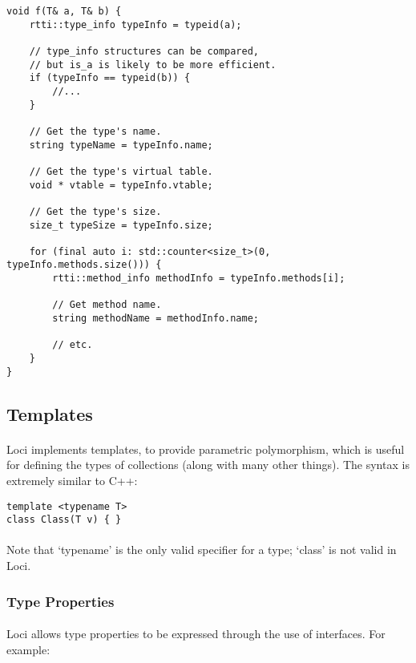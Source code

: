 \documentclass[12pt,twoside,notitlepage]{report}
\begin{document}
\begin{lstlisting}
void f(T& a, T& b) {
	rtti::type_info typeInfo = typeid(a);
	
	// type_info structures can be compared,
	// but is_a is likely to be more efficient.
	if (typeInfo == typeid(b)) {
		//...
	}
	
	// Get the type's name.
	string typeName = typeInfo.name;
	
	// Get the type's virtual table.
	void * vtable = typeInfo.vtable;
	
	// Get the type's size.
	size_t typeSize = typeInfo.size;
	
	for (final auto i: std::counter<size_t>(0, typeInfo.methods.size())) {
		rtti::method_info methodInfo = typeInfo.methods[i];
		
		// Get method name.
		string methodName = methodInfo.name;
		
		// etc.
	}
}
\end{lstlisting}

\clearpage

\subsection{Templates}

\paragraph{}
Loci implements templates, to provide parametric polymorphism, which is useful for defining the types of collections (along with many other things). The syntax is extremely similar to C++:

\begin{lstlisting}
template <typename T>
class Class(T v) { }
\end{lstlisting}

\paragraph{}
Note that `typename' is the only valid specifier for a type; `class' is not valid in Loci.

\subsubsection{Type Properties}

\paragraph{}
Loci allows type properties to be expressed through the use of interfaces. For example:
\end{document}

